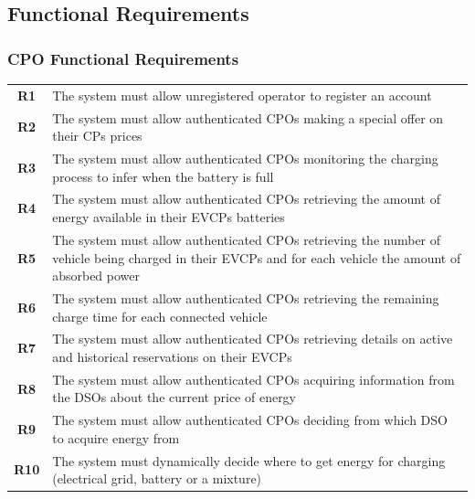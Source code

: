 \subsection{Functional Requirements}


\subsubsection{CPO Functional Requirements}
\begin{table}[H]
    \begin{tabularx}{\textwidth}{cX}
        \toprule
        \textbf{R1}  & The system must allow unregistered operator to register an account                                                                                       \\
        \textbf{R2}  & The system must allow authenticated CPOs making a special offer on their CPs prices                                                                      \\
        \textbf{R3}  & The system must allow authenticated CPOs monitoring the charging process to infer when the battery is full                                               \\
        \textbf{R4}  & The system must allow authenticated CPOs retrieving the amount of energy available in their EVCPs batteries                                              \\
        \textbf{R5}  & The system must allow authenticated CPOs retrieving the number of vehicle being charged in their EVCPs and for each vehicle the amount of absorbed power \\
        \textbf{R6}  & The system must allow authenticated CPOs retrieving the remaining charge time for each connected vehicle                                                 \\
        \textbf{R7}  & The system must allow authenticated CPOs retrieving details on active and historical reservations on their EVCPs                                         \\
        \textbf{R8}  & The system must allow authenticated CPOs acquiring information from the DSOs about the current price of energy                                           \\
        \textbf{R9}  & The system must allow authenticated CPOs deciding from which DSO to acquire energy from                                                                  \\
        \textbf{R10} & The system must dynamically decide where to get energy for charging (electrical grid, battery or a mixture)                                              \\

\end{tabularx}
\end{table}
